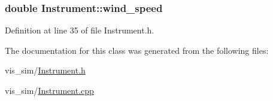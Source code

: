 \hypertarget{classInstrument_a7e18ced4e4e556e5203c046c2ebb3c63}{
\subsubsection[{wind\_\-speed}]{\setlength{\rightskip}{0pt plus 5cm}double {\bf Instrument::wind\_\-speed}}}
\label{classInstrument_a7e18ced4e4e556e5203c046c2ebb3c63}


Definition at line 35 of file Instrument.h.



The documentation for this class was generated from the following files:\begin{DoxyCompactItemize}
\item 
vis\_\-sim/\hyperlink{Instrument_8h}{Instrument.h}\item 
vis\_\-sim/\hyperlink{Instrument_8cpp}{Instrument.cpp}\end{DoxyCompactItemize}
